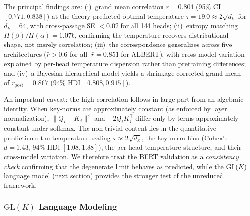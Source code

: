 \documentclass[twoside,11pt]{article}
\begin{document}
The principal findings are: (i)~grand mean correlation $\bar{r} = 0.804$ (95\% CI $[0.771, 0.838]$) at the theory-predicted optimal temperature $\tau = 19.0 \approx 2\sqrt{d_k}$ for $d_k = 64$, with cross-passage SE $< 0.02$ for all 144 heads; (ii)~entropy matching $H(\beta)/H(\alpha) = 1.076$, confirming the temperature recovers distributional shape, not merely correlation; (iii)~the correspondence generalizes across five architectures ($\bar{r} > 0.6$ for all, $\bar{r} = 0.851$ for ALBERT), with cross-model variation explained by per-head temperature dispersion rather than pretraining differences; and (iv)~a Bayesian hierarchical model yields a shrinkage-corrected grand mean of $\bar{r}_{\mathrm{post}} = 0.867$ (94\% HDI $[0.808, 0.915]$).

An important caveat: the high correlation follows in large part from an algebraic identity. When key-norms are approximately constant (as enforced by layer normalization), $\|Q_i - K_j\|^2$ and $-2Q_i K_j^\top$ differ only by terms approximately constant under softmax. The non-trivial content lies in the quantitative predictions: the temperature scaling $\tau \approx 2\sqrt{d_k}$, the key-norm bias (Cohen's $d = 1.43$, 94\% HDI $[1.08, 1.88]$), the per-head temperature structure, and their cross-model variation. We therefore treat the BERT validation as a \emph{consistency check} confirming that the degenerate limit behaves as predicted, while the GL($K$) language model (next section) provides the stronger test of the unreduced framework.

\subsubsection{$\mathrm{GL}(K)$ Language Modeling}
\label{sec:experimental_design_glk}
\end{document}
